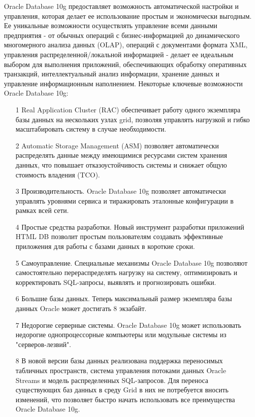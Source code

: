 Oracle Database 10g предоставляет возможность автоматической настройки и управления, которая делает ее использование простым и экономически выгодным. Ее уникальные возможности осуществлять управление всеми данными предприятия - от обычных операций с бизнес-информацией до динамического многомерного анализа данных (OLAP), операций с документами формата XML, управления распределенной/локальной информацией - делает ее идеальным выбором для выполнения приложений, обеспечивающих обработку оперативных транзакций, интеллектуальный анализ информации, хранение данных и управление информационным наполнением.
Некоторые ключевые возможности Oracle Database 10g:
\begin{itemize}
    \item[1] Real Application Cluster (RAC) обеспечивает работу одного экземпляра базы данных на нескольких узлах grid, позволяя управлять нагрузкой и гибко масштабировать систему в случае необходимости.
    \item[2] Automatic Storage Management (ASM) позволяет автоматически распределять данные между имеющимися ресурсами систем хранения данных, что повышает отказоустойчивость системы и снижает общую стоимость владения (TCO).
    \item[3] Производительность. Oracle Database 10g позволяет автоматически управлять уровнями сервиса и тиражировать эталонные конфигурации в рамках всей сети.
    \item[4] Простые средства разработки. Новый инструмент разработки приложений HTML DB позволит простым пользователям создавать эффективные приложения для работы с базами данных в короткие сроки.
    \item[5] Самоуправление. Специальные механизмы Oracle Database 10g позволяют самостоятельно перераспределять нагрузку на систему, оптимизировать и корректировать SQL-запросы, выявлять и прогнозировать ошибки.
    \item[6] Большие базы данных. Теперь максимальный размер экземпляра базы данных Oracle может достигать 8 экзабайт.
    \item[7] Недорогие серверные системы. Oracle Database 10g может использовать недорогие однопроцессорные компьютеры или модульные системы из "серверов-лезвий".
    \item[8] В новой версии базы данных реализована поддержка переносимых табличных пространств, система управления потоками данных Oracle Streams и модель распределенных SQL-запросов. Для переноса существующих баз данных в среду Grid в них не потребуется вносить изменений, что позволяет быстро начать использовать все преимущества Oracle Database 10g.
\end{itemize}

